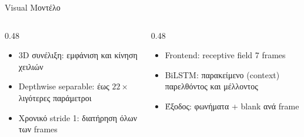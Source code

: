 \documentclass[aspectratio=169,10pt,xcolor=table]{beamer}
\begin{document}
\begin{frame}{Visual Μοντέλο}
  \small
  \begin{columns}[T]
    \begin{column}{0.48\textwidth}
      \begin{itemize}
        \item 3D συνέλιξη: εμφάνιση και κίνηση χειλιών
        \item Depthwise separable: έως $22\times$ λιγότερες παράμετροι
        \item Χρονικό stride 1: διατήρηση όλων των frames
      \end{itemize}
    \end{column}
    \begin{column}{0.48\textwidth}
      \begin{itemize}
        \item Frontend: receptive field 7 frames
        \item BiLSTM: παρακείμενο (context) παρελθόντος και μέλλοντος
        \item Έξοδος: φωνήματα + blank ανά frame
      \end{itemize}
    \end{column}
  \end{columns}
\end{frame}
\end{document}
